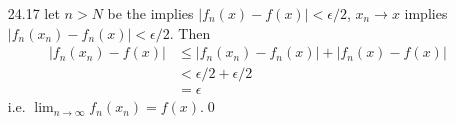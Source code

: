 \documentclass[paper=a4, fontsize=11pt]{scrartcl} %
\numberwithin{equation}{section} %
\numberwithin{figure}{section} %
\numberwithin{table}{section} %
\begin{document}
\begin{itemize}
\begin{equation}
\begin{split}
	&< \epsilon/3 + \epsilon/3 + \epsilon/3 \\
	&= \epsilon
	\end{split}
	\end{equation}
	i.e. $f$ is uniformly continuous.\qed
\item[24.17] let $n>N$ be the implies $|f_n(x)-f(x)|<\epsilon/2$, $x_n\rightarrow x$ implies $|f_n(x_n)-f_n(x)|<\epsilon/2$. Then
\begin{equation}\begin{split}
	|f_n(x_n) - f(x)| &\leq |f_n(x_n)-f_n(x)| + |f_n(x)-f(x)| \\
	 &< \epsilon/2 + \epsilon/2 \\
	 &= \epsilon
\end{split}
	\end{equation}
i.e. $\lim_{n\rightarrow\infty} f_n(x_n) = f(x)$.\qed
\end{itemize}
\end{document}
